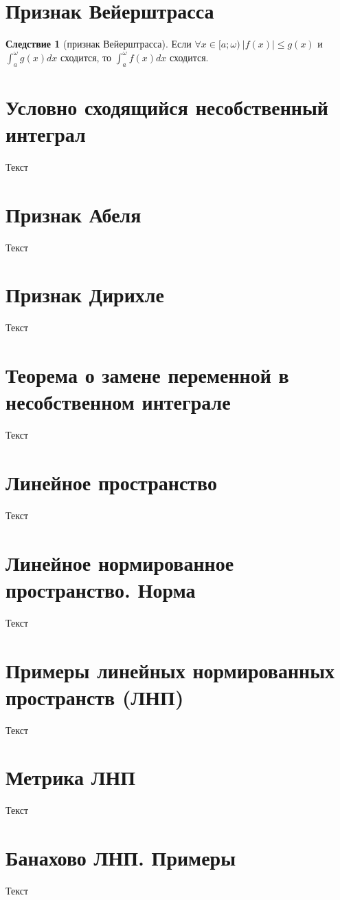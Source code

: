 \documentclass{report}
\theoremstyle{definition}
\newtheorem*{effect}{Следствие}
\begin{document}
\section{Признак Вейерштрасса}

\begin{effect}[признак Вейерштрасса]
    Если $\forall x \in [a;\omega) \ | f(x) | \leqslant g(x)$ и $\int_{a}^{\omega}g(x)dx$ сходится, то
    $\int_{a}^{\omega}f(x)dx$ сходится.
\end{effect}

\section{Условно сходящийся несобственный интеграл}
Текст

\section{Признак Абеля}
Текст

\section{Признак Дирихле}
Текст

\section{Теорема о замене переменной в несобственном интеграле}
Текст

\section{Линейное пространство}
Текст

\section{Линейное нормированное пространство. Норма}
Текст

\section{Примеры линейных нормированных пространств (ЛНП)}
Текст

\section{Метрика ЛНП}
Текст

\section{Банахово ЛНП. Примеры}
Текст
\end{document}

